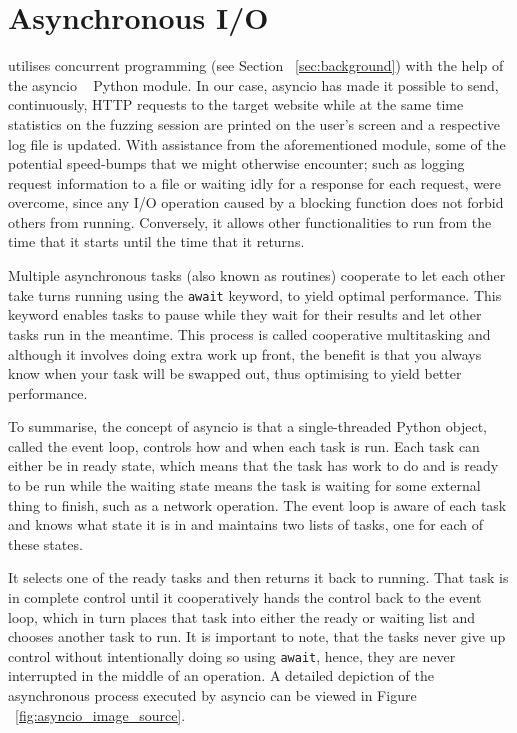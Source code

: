\section{Asynchronous I/O}
\pname{} utilises concurrent programming (see Section ~\ref{sec:background}) with the help of the asyncio ~\cite{asyncio} Python module. In our case, asyncio has made it possible to send, continuously, HTTP requests to the target website while at the same time statistics on the fuzzing session are printed on the user's screen and a respective log file is updated. With assistance from the aforementioned module, some of the potential speed-bumps that we might otherwise encounter; such as logging request information to a file or waiting idly for a response for each request, were overcome, since any I/O operation caused by a blocking function does not forbid others from running. Conversely, it allows other functionalities to run from the time that it starts until the time that it returns. 

Multiple asynchronous tasks (also known as routines) cooperate to let each other take turns running using the {\tt await} keyword, to yield optimal performance. This keyword enables tasks to pause while they wait for their results and let other tasks run in the meantime. This process is called cooperative multitasking and although it involves doing extra work up front, the benefit is that you always know when your task will be swapped out, thus optimising to yield better performance.

To summarise, the concept of asyncio is that a single-threaded Python object, called the event loop, controls how and when each task is run. Each task can either be in ready state, which means that the task has work to do and is ready to be run while the waiting state means the task is waiting for some external thing to finish, such as a network operation. The event loop is aware of each task and knows what state it is in and maintains two lists of tasks, one for each of these states. 

It selects one of the ready tasks and then returns it back to running. That task is in complete control until it cooperatively hands the control back to the event loop, which in turn places that task into either the ready or waiting list and chooses another task to run. It is important to note, that the tasks never give up control without intentionally doing so using {\tt await}, hence, they are never interrupted in the middle of an operation. A detailed depiction of the asynchronous process executed by asyncio can be viewed in Figure ~\ref{fig:asyncio_image_source}.

